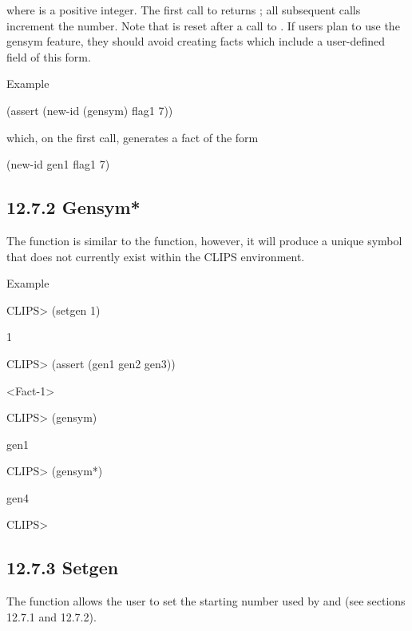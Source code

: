 \documentclass[letterpaper,10pt,english]{sphinxmanual}
\begin{document}
where  is a positive integer. The first call to  returns
; all subsequent calls increment the number. Note that
 is  reset after a call to . If users plan to
use the gensym feature, they should avoid creating facts which include a
user-defined field of this form.

Example

(assert (new-id (gensym) flag1 7))

which, on the first call, generates a fact of the form

(new-id gen1 flag1 7)


\subsection{12.7.2 Gensym*}
\label{\detokenize{actions:gensym-1}}\label{\detokenize{actions:id4}}
The  function is similar to the  function,
however, it will produce a unique symbol that does not currently exist
within the CLIPS environment.

Example

CLIPS\textgreater{} (setgen 1)

1

CLIPS\textgreater{} (assert (gen1 gen2 gen3))

\textless{}Fact-1\textgreater{}

CLIPS\textgreater{} (gensym)

gen1

CLIPS\textgreater{} (gensym*)

gen4

CLIPS\textgreater{}


\subsection{12.7.3 Setgen}
\label{\detokenize{actions:setgen}}
The  function allows the user to set the starting number used
by  and  (see sections 12.7.1 and 12.7.2).


\begin{sphinxVerbatim}[commandchars=\\\{\}]
 
\end{sphinxVerbatim}
\end{document}
